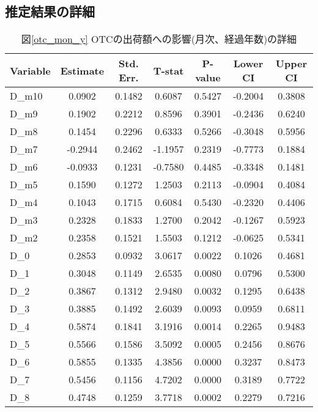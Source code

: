 \documentclass[a4paper,11pt,uplatex]{jsarticle}
\theoremstyle{definition}
\begin{document}
\begin{appendices}
    \section{推定結果の詳細}\label{event_parameter}
    \begin{table}[H]
        \small
        \centering
        \caption{図\ref{otc_mon_y} OTCの出荷額への影響(月次、経過年数)の詳細}
        \begin{tabular}{lcccccc}
        \hline
        \textbf{Variable} & \textbf{Estimate} & \textbf{Std. Err.} & \textbf{T-stat} & \textbf{P-value} & \textbf{Lower CI} & \textbf{Upper CI} \\
        \hline
        D\_m10 & 0.0902 & 0.1482 & 0.6087 & 0.5427 & -0.2004 & 0.3808 \\
        D\_m9 & 0.1902 & 0.2212 & 0.8596 & 0.3901 & -0.2436 & 0.6240 \\
        D\_m8 & 0.1454 & 0.2296 & 0.6333 & 0.5266 & -0.3048 & 0.5956 \\
        D\_m7 & -0.2944 & 0.2462 & -1.1957 & 0.2319 & -0.7773 & 0.1884 \\
        D\_m6 & -0.0933 & 0.1231 & -0.7580 & 0.4485 & -0.3348 & 0.1481 \\
        D\_m5 & 0.1590 & 0.1272 & 1.2503 & 0.2113 & -0.0904 & 0.4084 \\
        D\_m4 & 0.1043 & 0.1715 & 0.6084 & 0.5430 & -0.2320 & 0.4406 \\
        D\_m3 & 0.2328 & 0.1833 & 1.2700 & 0.2042 & -0.1267 & 0.5923 \\
        D\_m2 & 0.2358 & 0.1521 & 1.5503 & 0.1212 & -0.0625 & 0.5341 \\
        D\_0 & 0.2853 & 0.0932 & 3.0617 & 0.0022 & 0.1026 & 0.4681 \\
        D\_1 & 0.3048 & 0.1149 & 2.6535 & 0.0080 & 0.0796 & 0.5300 \\
        D\_2 & 0.3867 & 0.1312 & 2.9480 & 0.0032 & 0.1295 & 0.6438 \\
        D\_3 & 0.3885 & 0.1492 & 2.6039 & 0.0093 & 0.0959 & 0.6811 \\
        D\_4 & 0.5874 & 0.1841 & 3.1916 & 0.0014 & 0.2265 & 0.9483 \\
        D\_5 & 0.5566 & 0.1586 & 3.5092 & 0.0005 & 0.2456 & 0.8676 \\
        D\_6 & 0.5855 & 0.1335 & 4.3856 & 0.0000 & 0.3237 & 0.8473 \\
        D\_7 & 0.5456 & 0.1156 & 4.7202 & 0.0000 & 0.3189 & 0.7722 \\
        D\_8 & 0.4748 & 0.1259 & 3.7718 & 0.0002 & 0.2279 & 0.7216 \\

\end{tabular}
\end{table}
\end{appendices}
\end{document}
